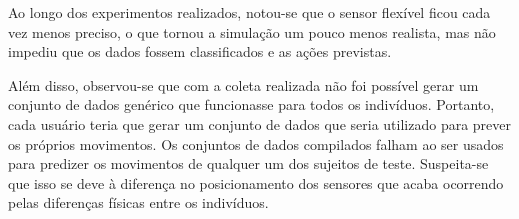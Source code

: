 Ao longo dos experimentos realizados, notou-se que o sensor flexível ficou cada vez menos preciso, o que tornou a simulação um pouco menos realista, mas não impediu que os dados fossem classificados e as ações previstas.

Além disso, observou-se que com a coleta realizada não foi possível gerar um conjunto de dados genérico que funcionasse para todos os indivíduos. Portanto, cada usuário teria que gerar um conjunto de dados que seria utilizado para prever os próprios movimentos. Os conjuntos de dados compilados falham ao ser usados para predizer os movimentos de qualquer um dos sujeitos de teste. Suspeita-se que isso se deve à diferença no posicionamento dos sensores que acaba ocorrendo pelas diferenças físicas entre os indivíduos.